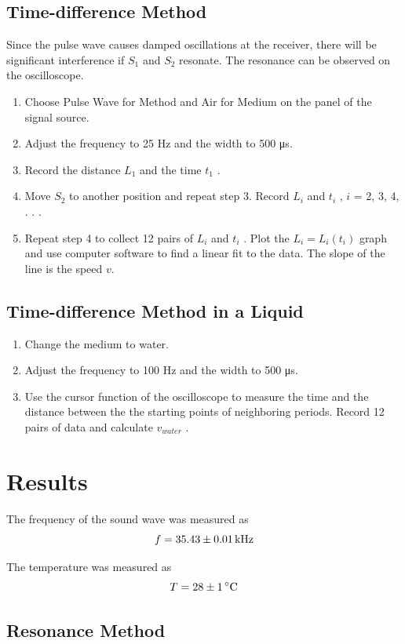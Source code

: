 \documentclass{article}
\begin{document}
\subsection{Time-difference Method}
Since the pulse wave causes damped oscillations at the receiver, there will be significant
interference if $S_1$ and $S_2$ resonate. The resonance can be observed on the oscilloscope.
\begin{enumerate}
\item
Choose Pulse Wave for Method and Air for Medium on the panel of the signal
source.
\item
Adjust the frequency to 25 Hz and the width to 500 μs.
\item
Record the distance $L_1$ and the time $t_1$ .
\item
Move $S_2$ to another position and repeat step 3. Record $L_i$ and $t_i$ , $i$ = 2, 3, 4, . . .
\item
Repeat step 4 to collect 12 pairs of $L_i$ and $t_i$ . Plot the $L_i = L_i (t_i)$ graph and use
computer software to find a linear fit to the data. The slope of the line is the speed $v$.
\end{enumerate}

\subsection{Time-difference Method in a Liquid}

\begin{enumerate}
\item
Change the medium to water.
\item
Adjust the frequency to 100 Hz and the width to 500 μs.
\item
Use the cursor function of the oscilloscope to measure the time and the distance
between the the starting points of neighboring periods. Record 12 pairs of data and
calculate $v_{water}$ .
\end{enumerate}

\section{Results}

The frequency of the sound wave was measured as
$$f=35.43\pm0.01\,\rm{kHz}$$

The temperature was measured as
$$T=28\pm1\,\rm{^\circ C}$$

\subsection{Resonance Method}
\end{document}
